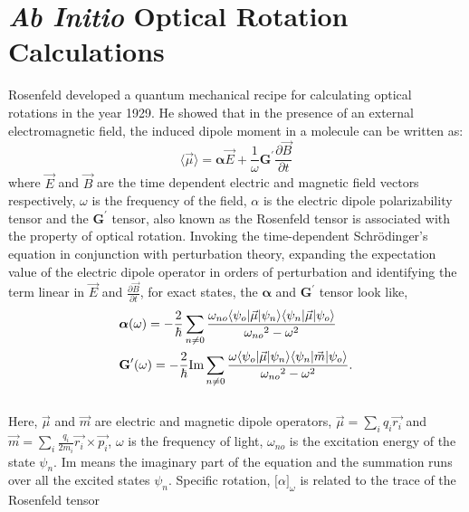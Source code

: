 \section{{\em Ab Initio} Optical Rotation Calculations}
Rosenfeld developed a quantum mechanical recipe for calculating optical rotations in the year
1929\cite{Rosenfeld29}. He showed that in the presence of an external electromagnetic field,
the induced dipole moment in a molecule can be written as:
\begin{equation}\langle\vec{\mu}\rangle = \bm{\alpha}\vec{E} + \frac{1}{\omega}\textbf{G}^\prime\frac{\partial\vec{B}}{\partial t}
\end{equation} where $\vec{E} $ and $\vec{B}$ are the time dependent electric and
magnetic field vectors respectively, $\omega$ is the frequency of the field, $\alpha$ is the electric dipole
polarizability tensor and the $\textbf{G}^\prime$ tensor, also known as the Rosenfeld tensor is associated 
with the property of optical rotation. Invoking the time-dependent Schr\"odinger's equation in conjunction 
with perturbation theory, expanding the expectation value of the electric dipole operator in orders of perturbation 
and identifying the term linear in $\vec{E}$ and $\frac{\partial\vec{B}}{\partial t}$, 
for exact states, the $\bm{\alpha}$ and $\textbf{G}^\prime$ tensor look like,
\\
\begin{equation}
\begin{split}
& \mbox{\boldmath $\alpha$}(\omega) = -\frac{2}{\hbar} \sum_{n \neq 0}\frac{\omega_{no}\langle \psi_o |\vec{\mu}| \psi_n \rangle\langle \psi_n |\vec{\mu}| \psi_o \rangle}{{\omega_{no}}^2 - {\omega}^2 }\\
& \textbf{G}^{\prime}(\omega) = -\frac{2}{\hbar} \text{Im}\sum_{n \neq 0}\frac{\omega \langle \psi_o |\vec{\mu}| \psi_n \rangle\langle \psi_n |\vec{m}| \psi_o \rangle}{{\omega_{no}}^2 - {\omega}^2 }.\\
\end{split}
\end{equation}
\\
Here, $\vec{\mu}$ and $\vec{m}$ are electric and magnetic dipole operators, 
$\vec{\mu} = \sum\limits_i q_i \vec{{r}_i}$ and $\vec{m} = \sum\limits_i \frac{q_i}{2m_i} \vec{{r}_i} \times \vec{{p}_i}$, $\omega$ is the frequency of light, $\omega_{no}$ is the excitation energy of the state $\psi_n$.
Im means the imaginary part of the equation and the summation runs over all the excited
states $\psi_n$. Specific rotation, ${\lbrack\alpha\rbrack}_\omega$ is related to the trace of the Rosenfeld tensor 
